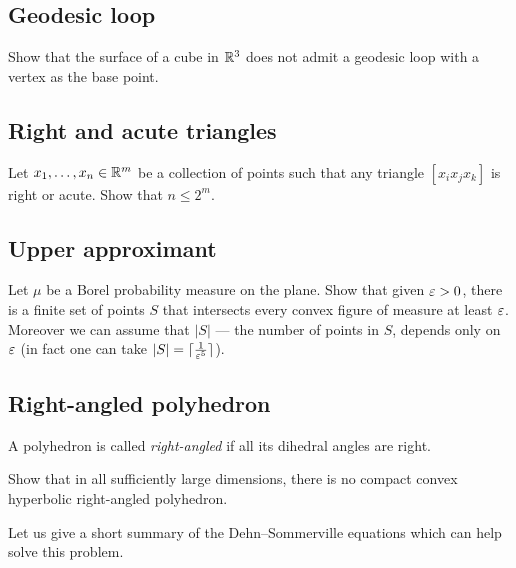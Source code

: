 \subsection*{Geodesic loop}\label{Geodesic loop}

\begin{pr}
Show that the surface of a cube in $\mathbb{R}^3$
does not admit a geodesic loop with a vertex as the base point.
\end{pr}

\subsection*{Right and acute triangles}\label{Right and acute triangles}

\begin{pr}
Let $x_1,\dots,x_n\in\mathbb{R}^m$
be a collection of points such that any triangle $[x_ix_jx_k]$ is right or acute.
Show that $n\le 2^m$.
\end{pr}

\subsection*{Upper approximant}\label{One-sided approximants}

\begin{pr}
Let $\mu$ be a Borel probability measure on the plane.
Show that given $\varepsilon>0$, there is a finite set of points $S$ that intersects every convex figure of measure at least $\varepsilon$.
Moreover we can assume that $|S|$ --- the number of points in $S$, depends only on $\varepsilon$ (in fact one can take $|S|=\lceil\tfrac1{\varepsilon^5}\rceil$).
\end{pr}

\subsection*{Right-angled polyhedron\thm}\label{Right-angled polyhedron}

A polyhedron is called {}\emph{right-angled} if all its dihedral angles are right.

\begin{pr}
Show that in all sufficiently large dimensions, there is no compact convex hyperbolic right-angled polyhedron. 
\end{pr}

Let us give a short summary of the Dehn--Sommerville equations which can help solve this problem.

